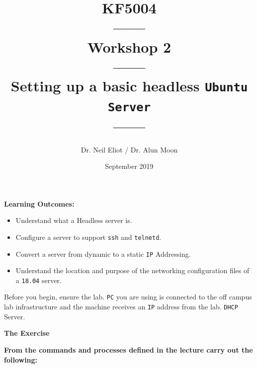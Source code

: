 \documentclass[11pt]{article}
\begin{document}
\author{Dr. Neil Eliot / Dr. Alun Moon}
\title{KF5004\\------\\Workshop 2\\------\\Setting up a basic headless \texttt{Ubuntu Server}\\------}
\date{September 2019}
\maketitle

\newpage



\noindent\textbf{Learning Outcomes:}
\begin{itemize}
    \item Understand what a Headless server is.
    \item Configure a server to support \texttt{ssh} and \texttt{telnetd}.
    \item Convert a server from dynamic to a static \texttt{IP} Addressing.
    \item Understand the location and purpose of the networking configuration files of a \texttt{18.04} server.
\end{itemize}


\begin{tcolorbox}[title={\textbf{Important:}}]
    Before you begin, ensure the lab. \texttt{PC} you are using is connected to the off campus lab infrastructure and the machine receives an \texttt{IP} address from the lab. \texttt{DHCP} Server.
\end{tcolorbox}
\newpage

\noindent\textbf{The Exercise}\\
\begin{tcolorbox}[colback=blue!20]
    \noindent\textbf{From the commands and processes defined in the lecture carry out the following:}
\end{tcolorbox}
\end{document}
